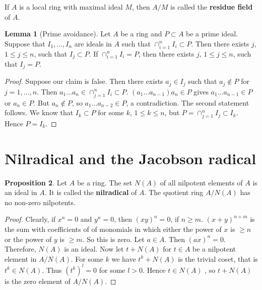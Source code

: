 \documentclass{article}
\newcommand{\rb}[1]{\left( #1 \right)}
\theoremstyle{definition}\newtheorem{definition}{Definition}[section]
\theoremstyle{definition}\newtheorem{remark}[definition]{Remark}
\theoremstyle{definition}\newtheorem*{example}{Example}
\theoremstyle{definition}\newtheorem*{note}{Note}
\newtheorem{proposition}[definition]{Proposition}
\newtheorem{lemma}[definition]{Lemma}
\begin{document}
If $ A $ is a local ring with maximal ideal $ M $, then $ A / M $ is called the \textbf{residue field} of $ A $.

\begin{lemma}[Prime avoidance]
\label{lem:4.12}
Let $ A $ be a ring and $ P \subset A $ be a prime ideal. Suppose that $ I_1, \dots, I_n $ are ideals in $ A $ such that $ \cap_{i = 1}^n I_i \subset P $. Then there exists $ j $, $ 1 \le j \le n $, such that $ I_j \subset P $. If $ \cap_{i = 1}^n I_i = P $, then there exists $ j $, $ 1 \le j \le n $, such that $ I_j = P $.
\end{lemma}

\begin{proof}
Suppose our claim is false. Then there exists $ a_j \in I_j $ such that $ a_j \notin P $ for $ j = 1, \dots, n $. Then $ a_1 \dots a_n \in \cap_{j = 1}^n I_i \subset P $. $ \rb{a_1 \dots a_{n - 1}}a_n \in P $ gives $ a_1 \dots a_{n - 1} \in P $ or $ a_n \in P $. But $ a_n \notin P $, so $ a_1 \dots a_{n - 2} \in P $, a contradiction. The second statement follows. We know that $ I_k \subset P $ for some $ k $, $ 1 \le k \le n $, but $ P = \cap_{j = 1}^n I_j \subset I_k $. Hence $ P = I_k $.
\end{proof}


\section{Nilradical and the Jacobson radical}

\begin{proposition}
Let $ A $ be a ring. The set $ N\rb{A} $ of all nilpotent elements of $ A $ is an ideal in $ A $. It is called the \textbf{nilradical} of $ A $. The quotient ring $ A / N\rb{A} $ has no non-zero nilpotents.
\end{proposition}

\begin{proof}
Clearly, if $ x^n = 0 $ and $ y^n = 0 $, then $ \rb{xy}^n = 0 $, if $ n \ge m $. $ \rb{x + y}^{n + m} $ is the sum with coefficients of of monomials in which either the power of $ x $ is $ \ge n $ or the power of $ y $ is $ \ge m $. So this is zero. Let $ a \in A $. Then $ \rb{ax}^n = 0 $. Therefore, $ N\rb{A} $ is an ideal. Now let $ t + N\rb{A} $ for $ t \in A $ be a nilpotent element in $ A / N\rb{A} $. For some $ k $ we have $ t^k + N\rb{A} $ is the trivial coset, that is $ t^k \in N\rb{A} $. Thus $ \rb{t^k}^l = 0 $ for some $ l > 0 $. Hence $ t \in N\rb{A} $ , so $ t + N\rb{A} $ is the zero element of $ A / N\rb{A} $.
\end{proof}
\end{document}
